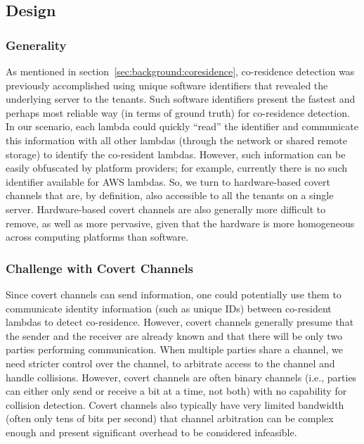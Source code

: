 \subsection{Design}

\subsubsection{Generality}
As mentioned in section~\ref{sec:background:coresidence}, co-residence detection
was previously accomplished using unique software identifiers that revealed
the underlying server to the tenants. Such software identifiers
present the fastest and perhaps most reliable way (in terms of ground
truth) for co-residence detection. 
In our scenario, each lambda could quickly ``read'' the identifier
and communicate this information with all other lambdas (through the network or
shared remote storage) to identify the co-resident lambdas. However, such
information can be easily obfuscated by platform providers; for example,
currently there is no such identifier available for AWS lambdas.  So, we turn to
hardware-based covert channels that are, by definition, also accessible to all
the tenants on a single server. Hardware-based covert channels are also
generally more difficult to remove, as well as more pervasive,
given that the hardware is more homogeneous across computing platforms
than software. 


\subsubsection{Challenge with Covert Channels}
Since covert channels can send information, one could potentially use them 
to communicate identity information (such as unique
IDs) between co-resident lambdas to detect co-residence. 
However, covert channels generally presume
that the sender and the receiver are already known and that there will be only
two parties performing communication. When multiple parties share a channel, we
need stricter control over the channel, to arbitrate access to the channel and
handle collisions.  However, covert channels are often binary channels (i.e.,
parties can either only send or receive a bit at a time, 
not both) with no capability for
collision detection. Covert channels also typically have very limited bandwidth
(often only tens of bits per second) that channel arbitration can be complex
enough and present significant overhead to be considered infeasible.


